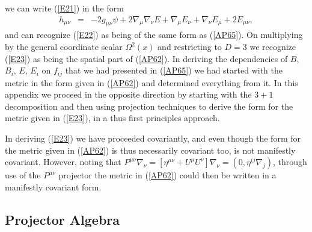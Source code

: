 \documentclass[aps]{revtex4}
\begin{document}
%
we can write (\ref{E21}) in the form
%
\begin{eqnarray}
h_{\mu\nu}&=&-2g_{\mu\nu}\psi+2\nabla_{\mu}\nabla_{\nu}E
+ \nabla_{\mu}E_{\nu}+\nabla_{\nu}E_{\mu}+2E_{\mu\nu},
\label{E23}
\end{eqnarray}
%
and can recognize (\ref{E22}) as being of the same form as (\ref{AP65}). On multiplying by the general coordinate scalar $\Omega^2(x)$ and restricting to $D=3$ we recognize (\ref{E23}) as being the spatial part of (\ref{AP62}). In deriving the dependencies of $B$, $B_i$, $E$, $E_i$ on $f_{ij}$ that we had presented in (\ref{AP65}) we had started with the metric in the form given in (\ref{AP62}) and determined everything from it. In this appendix we proceed in the opposite direction by starting with the $3+1$ decomposition and then using projection techniques to derive the form for the metric given in (\ref{E23}), in a thus first principles approach.

In deriving (\ref{E23}) we have proceeded covariantly, and even though the form for the metric given in (\ref{AP62}) is thus necessarily covariant too, is not manifestly covariant. However, noting that $P^{\mu\nu}\nabla_{\nu}=[\eta^{\mu\nu}+U^{\mu}U^{\nu}]\nabla_{\nu}= (0,\eta^{ij}\nabla_j)$, through use of  the $P^{\mu\nu}$ projector the metric in (\ref{AP62}) could then be written in a manifestly covariant form.

\subsection{Projector Algebra}
\end{document}
